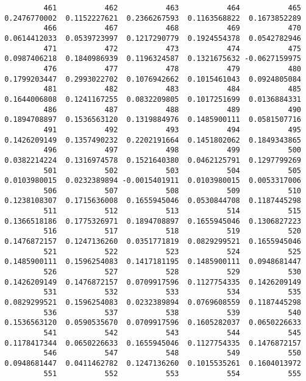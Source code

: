 \documentclass[
  letterpaper,
  DIV=11,
  numbers=noendperiod]{scrreprt}
\begin{document}
\begin{verbatim}
          461           462           463           464           465 
 0.2476770002  0.1152227621  0.2366267593  0.1163568822  0.1673852289 
          466           467           468           469           470 
 0.0614412033  0.0539723997  0.1217290779  0.1924554378  0.0542782946 
          471           472           473           474           475 
 0.0987406218  0.1840986939  0.1196324587  0.1321675632 -0.0627159975 
          476           477           478           479           480 
 0.1799203447  0.2993022702  0.1076942662  0.1015461043  0.0924805084 
          481           482           483           484           485 
 0.1644006808  0.1241167255  0.0832209805  0.1017251699  0.0136884331 
          486           487           488           489           490 
 0.1894708897  0.1536563120  0.1319884976  0.1485900111  0.0581507716 
          491           492           493           494           495 
 0.1426209149  0.1357490232  0.2202191664  0.1451802062  0.1849343865 
          496           497           498           499           500 
 0.0382214224  0.1316974578  0.1521640380  0.0462125791  0.1297799269 
          501           502           503           504           505 
 0.0103980015  0.0232389894 -0.0015401911  0.0103980015  0.0053317006 
          506           507           508           509           510 
 0.1238108307  0.1715636008  0.1655945046  0.0530844708  0.1187445298 
          511           512           513           514           515 
 0.1366518186  0.1775326971  0.1894708897  0.1655945046  0.1306827223 
          516           517           518           519           520 
 0.1476872157  0.1247136260  0.0351771819  0.0829299521  0.1655945046 
          521           522           523           524           525 
 0.1485900111  0.1596254083  0.1417181195  0.1485900111  0.0948681447 
          526           527           528           529           530 
 0.1426209149  0.1476872157  0.0709917596  0.1127754335  0.1426209149 
          531           532           533           534           535 
 0.0829299521  0.1596254083  0.0232389894  0.0769608559  0.1187445298 
          536           537           538           539           540 
 0.1536563120  0.0590535670  0.0709917596  0.1605282037  0.0650226633 
          541           542           543           544           545 
 0.1178417344  0.0650226633  0.1655945046  0.1127754335  0.1476872157 
          546           547           548           549           550 
 0.0948681447  0.0411462782  0.1247136260  0.1015535261  0.1604013972 
          551           552           553           554           555 

\end{verbatim}
\end{document}
